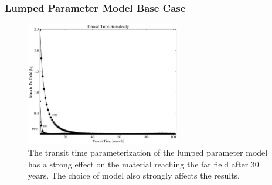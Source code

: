
\begin{frame}[ctb!]
\frametitle{Lumped Parameter Model Base Case}
\begin{figure}[ht]
\centering
\includegraphics[width=0.6\textwidth]{./images/lp_t_t.eps}
\caption[Lumped Parameter Transit Time Sensitivity]{The transit time 
parameterization of the lumped parameter model
has a strong effect on the material reaching the far field after 30 
years. The choice of model also strongly affects the results. }
\label{fig:lp_t_t_begin}
\end{figure}
\end{frame}
